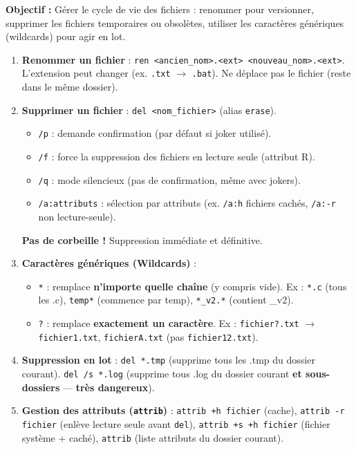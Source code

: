 \documentclass[11pt]{article}
\begin{document}
\begin{methode}
\textbf{Objectif :} Gérer le cycle de vie des fichiers : renommer pour versionner, supprimer les fichiers temporaires ou obsolètes, utiliser les caractères génériques (wildcards) pour agir en lot.

\begin{enumerate}
    \item \textbf{Renommer un fichier} : \texttt{ren <ancien\_nom>.<ext> <nouveau\_nom>.<ext>}. L'extension peut changer (ex. \texttt{.txt} $\to$ \texttt{.bat}). Ne déplace pas le fichier (reste dans le même dossier).
    \item \textbf{Supprimer un fichier} : \texttt{del <nom\_fichier>} (alias \texttt{erase}). 
    \begin{itemize}
        \item \texttt{/p} : demande confirmation (par défaut si joker utilisé).
        \item \texttt{/f} : force la suppression des fichiers en lecture seule (attribut R).
        \item \texttt{/q} : mode silencieux (pas de confirmation, même avec jokers).
        \item \texttt{/a:attributs} : sélection par attributs (ex. \texttt{/a:h} fichiers cachés, \texttt{/a:-r} non lecture-seule).
    \end{itemize}
    \textbf{Pas de corbeille !} Suppression immédiate et définitive.
    \item \textbf{Caractères génériques (Wildcards)} :
    \begin{itemize}
        \item \texttt{*} : remplace \textbf{n'importe quelle chaîne} (y compris vide). Ex : \texttt{*.c} (tous les .c), \texttt{temp*} (commence par temp), \texttt{*\_v2.*} (contient \_v2).
        \item \texttt{?} : remplace \textbf{exactement un caractère}. Ex : \texttt{fichier?.txt} $\to$ \texttt{fichier1.txt}, \texttt{fichierA.txt} (pas \texttt{fichier12.txt}).
    \end{itemize}
    \item \textbf{Suppression en lot} : \texttt{del *.tmp} (supprime tous les .tmp du dossier courant). \texttt{del /s *.log} (supprime tous .log du dossier courant \textbf{et sous-dossiers} — \textbf{très dangereux}).
    \item \textbf{Gestion des attributs (\texttt{attrib})} : \texttt{attrib +h fichier} (cache), \texttt{attrib -r fichier} (enlève lecture seule avant \texttt{del}), \texttt{attrib +s +h fichier} (fichier système + caché), \texttt{attrib} (liste attributs du dossier courant).
\end{enumerate}
\end{methode}
\end{document}

